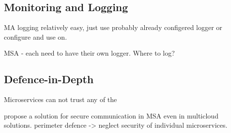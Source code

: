 \subsection{Monitoring and Logging}
\begin{sloppypar}
    MA logging relatively easy, just use probably already configered logger or 
    configure and use on.
\end{sloppypar}
\begin{sloppypar}
    MSA - each need to have their own logger. Where to log? 
\end{sloppypar}



\subsection{Defence-in-Depth}
\begin{sloppypar}
    Microservices can not trust any of the \citep{otterstad}
\end{sloppypar}
\begin{sloppypar}
    \citet{defdepau} propose a solution for secure communication in MSA even in multicloud solutions.
    perimeter defence -> neglect security of individual microservices.
\end{sloppypar}







